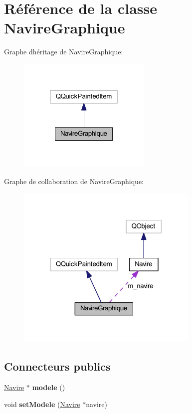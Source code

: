 \hypertarget{class_navire_graphique}{}\section{Référence de la classe Navire\+Graphique}
\label{class_navire_graphique}


Graphe d\textquotesingle{}héritage de Navire\+Graphique\+:
\nopagebreak
\begin{figure}[H]
\begin{center}
\leavevmode
\includegraphics[width=181pt]{class_navire_graphique__inherit__graph}
\end{center}
\end{figure}


Graphe de collaboration de Navire\+Graphique\+:
\nopagebreak
\begin{figure}[H]
\begin{center}
\leavevmode
\includegraphics[width=247pt]{class_navire_graphique__coll__graph}
\end{center}
\end{figure}
\subsection*{Connecteurs publics}
\begin{DoxyCompactItemize}
\item 
\hyperlink{class_navire}{Navire} $\ast$ {\bfseries modele} ()\hypertarget{class_navire_graphique_a82f9b5d7e51a400479ed6fb2ae64b001}{}\label{class_navire_graphique_a82f9b5d7e51a400479ed6fb2ae64b001}

\item 
void {\bfseries set\+Modele} (\hyperlink{class_navire}{Navire} $\ast$navire)\hypertarget{class_navire_graphique_aec964f5192f382c794d8bf48d7997aad}{}\label{class_navire_graphique_aec964f5192f382c794d8bf48d7997aad}

\end{DoxyCompactItemize}
